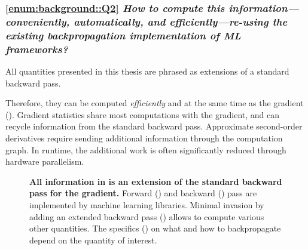 \subsubsection{\ref{enum:background::Q2} \emph{How to compute this
    information---conveniently, automatically, and efficiently---re-using the
    existing backpropagation implementation of ML frameworks?}}

All quantities presented in this thesis are phrased as extensions of a
standard backward pass.

Therefore, they can be computed \emph{efficiently} and at the same time as the
gradient (). Gradient
statistics share most computations with the gradient, and can recycle
information from the standard backward pass. Approximate second-order
derivatives require sending additional information through the computation
graph. In runtime, the additional work is often significantly reduced through
hardware parallelism.

\begin{figure}[!t]
  \centering
  \tikzexternalenable%
  \resizebox{\linewidth}{!}{%
    
  }%
  \tikzexternaldisable%
  \caption{\textbf{All information in
       is an extension of the
      standard backward pass for the gradient.} Forward
    ({\protect{}}) and backward
    ({\protect{}}) pass are implemented by machine learning
    libraries. Minimal invasion by adding an extended backward pass
    ({\protect{}}) allows to compute various other
    quantities. The specifics
    ({\protect{})}
    on what and how to backpropagate depend on the
    quantity of interest.}\label{fig:conclusion::extensionStandardBackwardPass}
\end{figure}


